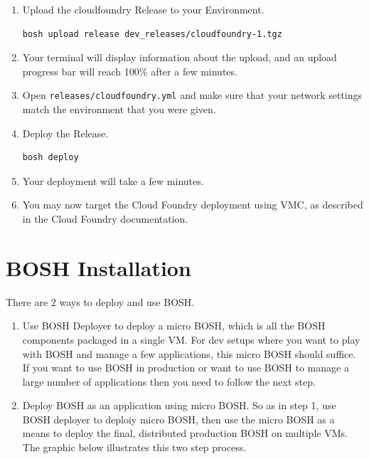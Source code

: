\begin{enumerate}
\item Upload the cloudfoundry Release to your Environment.

\begin{verbatim}
bosh upload release dev_releases/cloudfoundry-1.tgz
\end{verbatim}


\item Your terminal will display information about the upload, and an upload progress bar will reach 100\% after a few minutes.

\item Open \texttt{releases\slash cloudfoundry.yml} and make sure that your network settings match the environment that you were given.

\item Deploy the Release.

\begin{verbatim}
bosh deploy
\end{verbatim}


\item Your deployment will take a few minutes.

\item You may now target the Cloud Foundry deployment using VMC, as described in the Cloud Foundry documentation.

\end{enumerate}

\chapter{BOSH Installation}
\label{boshinstallation}

There are 2 ways to deploy and use BOSH.

\begin{enumerate}
\item Use BOSH Deployer to deploy a micro BOSH, which is all the BOSH components packaged in a single VM. For dev setups where you want to play with BOSH and manage a few applications, this micro BOSH should suffice. If you want to use BOSH in production or want to use BOSH to manage a large number of applications then you need to follow the next step.

\item Deploy BOSH as an application using micro BOSH. So as in step 1, use BOSH deployer to deploiy micro BOSH, then use the micro BOSH as a means to deploy the final, distributed production BOSH on multiple VMs. The graphic below illustrates this two step process.

\end{enumerate}

